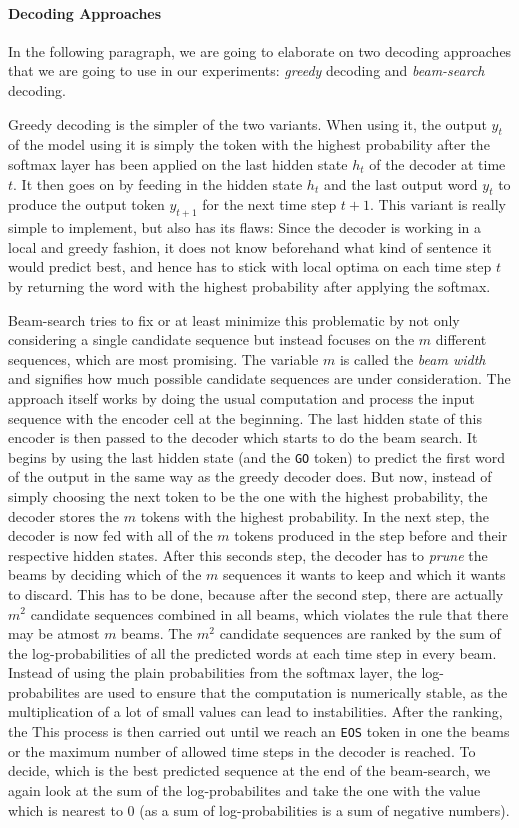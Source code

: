 \paragraph{Decoding Approaches} In the following paragraph, we are going to elaborate on two decoding approaches that we are going to use in our experiments: \emph{greedy} decoding and \emph{beam-search} decoding.

Greedy decoding is the simpler of the two variants. When using it, the output $y_t$ of the model using it is simply the token with the highest probability after the softmax layer has been applied on the last hidden state $h_t$ of the decoder at time $t$. It then goes on by feeding in the hidden state $h_t$ and the last output word $y_t$ to produce the output token $y_{t+1}$ for the next time step $t+1$. This variant is really simple to implement, but also has its flaws: Since the decoder is working in a local and greedy fashion, it does not know beforehand what kind of sentence it would predict best, and hence has to stick with local optima on each time step $t$ by returning the word with the highest probability after applying the softmax.

Beam-search tries to fix or at least minimize this problematic by not only considering a single candidate sequence but instead focuses on the $m$ different sequences, which are most promising. The variable $m$ is called the \emph{beam width} and signifies how much possible candidate sequences are under consideration. The approach itself works by doing the usual computation and process the input sequence with the encoder cell at the beginning. The last hidden state of this encoder is then passed to the decoder which starts to do the beam search. It begins by using the last hidden state (and the \texttt{GO} token) to predict the first word of the output in the same way as the greedy decoder does. But now, instead of simply choosing the next token to be the one with the highest probability, the decoder stores the $m$ tokens with the highest probability. In the next step, the decoder is now fed with all of the $m$ tokens produced in the step before and their respective hidden states. After this seconds step, the decoder has to \emph{prune} the beams by deciding which of the $m$ sequences it wants to keep and which it wants to discard. This has to be done, because after the second step, there are actually $m^2$ candidate sequences combined in all beams, which violates the rule that there may be atmost $m$ beams. The $m^2$ candidate sequences are ranked by the sum of the log-probabilities of all the predicted words at each time step in every beam. Instead of using the plain probabilities from the softmax layer, the log-probabilites are used to ensure that the computation is numerically stable, as the multiplication of a lot of small values can lead to instabilities. After the ranking, the  This process is then carried out until we reach an \texttt{EOS} token in one the beams or the maximum number of allowed time steps in the decoder is reached. To decide, which is the best predicted sequence at the end of the beam-search, we again look at the sum of the log-probabilites and take the one with the value which is nearest to $0$ (as a sum of log-probabilities is a sum of negative numbers).

